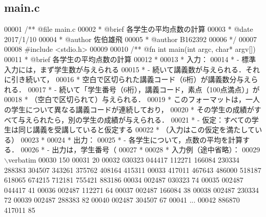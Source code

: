 \subsection{main.\-c}

\begin{DoxyCode}
00001 \textcolor{comment}{/**  @file main.c}
00002 \textcolor{comment}{ *   @brief  各学生の平均点数の計算}
00003 \textcolor{comment}{ *   @date   2017/1/10}
00004 \textcolor{comment}{ *   @author 佐伯雄飛}
00005 \textcolor{comment}{ *   @author B162392}
00006 \textcolor{comment}{ */}
00007 
00008 \textcolor{preprocessor}{#include <stdio.h>}
00009 \textcolor{comment}{}
00010 \textcolor{comment}{/** @fn int main(int argc, char* argv[])}
00011 \textcolor{comment}{ *  @brief 各学生の平均点数の計算}
00012 \textcolor{comment}{ *}
00013 \textcolor{comment}{ *  入力：}
00014 \textcolor{comment}{ *  - 標準入力には，まず学生数が与えられる}
00015 \textcolor{comment}{ *  - 続いて講義数が与えられる．それに引き続いて，}
00016 \textcolor{comment}{ *    空白で区切られた講義コード（6桁）が講義数分与えられる．}
00017 \textcolor{comment}{ *  - 続いて「学生番号（6桁），講義コード，素点（100点満点）」が}
00018 \textcolor{comment}{ *    （空白で区切られて）与えられる．}
00019 \textcolor{comment}{ *    このフォーマットは，一人の学生について異なる講義コードが連続しており，}
00020 \textcolor{comment}{ *    その学生の成績がすべて与えられたら，別の学生の成績が与えられる．}
00021 \textcolor{comment}{ *  - 仮定：すべての学生は同じ講義を受講していると仮定する}
00022 \textcolor{comment}{ *    （入力はこの仮定を満たしている）}
00023 \textcolor{comment}{ *}
00024 \textcolor{comment}{ *  出力：}
00025 \textcolor{comment}{ *  - 各学生について，点数の平均を計算する．}
00026 \textcolor{comment}{  *  - 出力は，学生番号（%
00027 \textcolor{comment}{ *}
00028 \textcolor{comment}{ *  入力例（途中省略）：}
00029 \textcolor{comment}{\(\backslash\)verbatim}
00030 \textcolor{comment}{150}
00031 \textcolor{comment}{20}
00032 \textcolor{comment}{030323 044417 112271 166084 230334 288383 304507 343261 375762 408164 415311}
00033 \textcolor{comment}{417011 467643 486000 518187 618065 674215 712181 755421 883186}
00034 \textcolor{comment}{002487 030323 74}
00035 \textcolor{comment}{002487 044417 41}
00036 \textcolor{comment}{002487 112271 64}
00037 \textcolor{comment}{002487 166084 38}
00038 \textcolor{comment}{002487 230334 72}
00039 \textcolor{comment}{002487 288383 82}
00040 \textcolor{comment}{002487 304507 67}
00041 \textcolor{comment}{...}
00042 \textcolor{comment}{886870 417011 85}
}
\end{DoxyCode}

